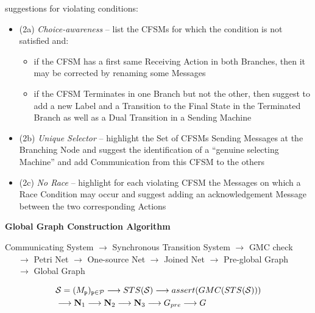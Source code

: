suggestions for violating conditions:
\begin{itemize}
\item (2a) \emph{Choice-awareness} -- list the CFSMs for which the
  condition is not satisfied and:
  \begin{itemize}
    \item if the CFSM has a first same Receiving Action in both
      Branches, then it may be corrected by renaming some Messages
    \item if the CFSM Terminates in one Branch but not the other, then
      suggest to add a new Label and a Transition to the Final State
      in the Terminated Branch as well as a Dual Transition in a
      Sending Machine
  \end{itemize}
\item (2b) \emph{Unique Selector} -- highlight the Set of CFSMs
  Sending Messages at the Branching Node and suggest the
  identification of a ``genuine selecting Machine'' and add
  Communication from this CFSM to the others
\item (2c) \emph{No Race} -- highlight for each violating CFSM the
  Messages on which a Race Condition may occur and suggest adding an
  acknowledgement Message between the two corresponding Actions
\end{itemize}


\textbf{Global Graph Construction Algorithm}

Communicating System $\longrightarrow$ Synchronous Transition System
  $\longrightarrow$ GMC check \\
\-\ \-\ \-\ $\longrightarrow$ Petri Net
  $\longrightarrow$ One-source Net $\longrightarrow$ Joined Net
  $\longrightarrow$ Pre-global Graph \\
\-\ \-\ \-\
  $\longrightarrow$ Global Graph

\begin{align*}
  & \mathcal{S} = (M_\mathtt{p})_{\mathtt{p}\in\mathcal{P}}
    \longrightarrow STS(\mathcal{S})
    \longrightarrow assert(GMC(STS(\mathcal{S}))) \\
  & \longrightarrow \mathbf{N}_1 \longrightarrow \mathbf{N}_2
    \longrightarrow \mathbf{N}_3 \longrightarrow G_{pre}
    \longrightarrow G
\end{align*}

